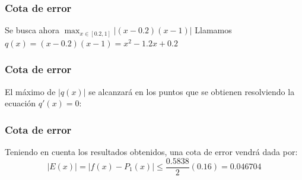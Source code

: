 \documentclass[10pt]{beamer}
\begin{document}
{
\frametitle{Cota de error}
Se busca ahora $\displaystyle\max_{x\in[0.2,1]}|(x-0.2)(x-1)|$
Llamamos $q(x)=(x - 0.2)(x - 1) = x^2 - 1.2x + 0.2$
}
\frame
{
\frametitle{Cota de error}
El m\'aximo de $|q(x)|$ se alcanzar\'a en los puntos que se obtienen resolviendo la ecuaci\'on $q'(x) = 0$:
}
\frame
{
\frametitle{Cota de error}
Teniendo en cuenta los resultados obtenidos, una cota de error vendr\'a dada por:
$$
|E(x)| = |f(x)-P_1(x)| \leq \frac{0.5838}{2}(0.16) = 0.046704
$$
}
\frame
\end{document}
